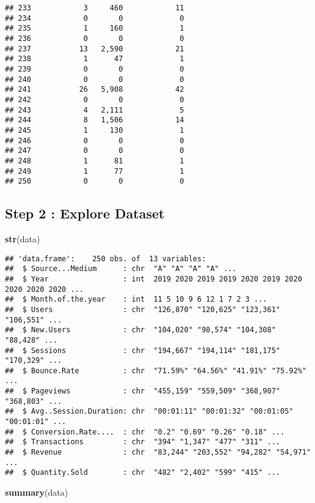 \documentclass[
]{article}
\newenvironment{Shaded}{\begin{snugshade}}{\end{snugshade}}
\newcommand{\FunctionTok}[1]{\textcolor[rgb]{0.13,0.29,0.53}{\textbf{#1}}}
\newcommand{\NormalTok}[1]{#1}
\begin{document}
\begin{verbatim}
## 233            3     460            11
## 234            0       0             0
## 235            1     160             1
## 236            0       0             0
## 237           13   2,590            21
## 238            1      47             1
## 239            0       0             0
## 240            0       0             0
## 241           26   5,908            42
## 242            0       0             0
## 243            4   2,111             5
## 244            8   1,506            14
## 245            1     130             1
## 246            0       0             0
## 247            0       0             0
## 248            1      81             1
## 249            1      77             1
## 250            0       0             0
\end{verbatim}

\subsection{Step 2 : Explore Dataset}\label{step-2-explore-dataset}

\begin{Shaded}
\begin{Highlighting}[]
\FunctionTok{str}\NormalTok{(data)}
\end{Highlighting}
\end{Shaded}

\begin{verbatim}
## 'data.frame':    250 obs. of  13 variables:
##  $ Source...Medium      : chr  "A" "A" "A" "A" ...
##  $ Year                 : int  2019 2020 2019 2019 2020 2019 2020 2020 2020 2020 ...
##  $ Month.of.the.year    : int  11 5 10 9 6 12 1 7 2 3 ...
##  $ Users                : chr  "126,870" "120,625" "123,361" "106,551" ...
##  $ New.Users            : chr  "104,020" "98,574" "104,308" "88,428" ...
##  $ Sessions             : chr  "194,667" "194,114" "181,175" "170,329" ...
##  $ Bounce.Rate          : chr  "71.59%" "64.56%" "41.91%" "75.92%" ...
##  $ Pageviews            : chr  "455,159" "559,509" "368,907" "368,803" ...
##  $ Avg..Session.Duration: chr  "00:01:11" "00:01:32" "00:01:05" "00:01:01" ...
##  $ Conversion.Rate....  : chr  "0.2" "0.69" "0.26" "0.18" ...
##  $ Transactions         : chr  "394" "1,347" "477" "311" ...
##  $ Revenue              : chr  "83,244" "203,552" "94,282" "54,971" ...
##  $ Quantity.Sold        : chr  "482" "2,402" "599" "415" ...
\end{verbatim}

\begin{Shaded}
\begin{Highlighting}[]
\FunctionTok{summary}\NormalTok{(data)}
\end{Highlighting}
\end{Shaded}
\end{document}
